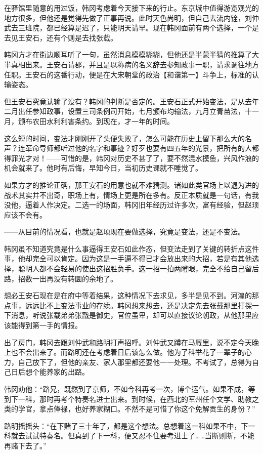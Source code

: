 在驿馆里随意的用过饭，韩冈考虑着今天接下来的行止。东京城中值得游览观光的地方很多，但他还是觉得先做了正事再说。此时天色尚明，但自己去流内铨，刘仲武去三班院，都已经算是迟了，只能明天请早。现在韩冈面前有两个选择，一个是去见王安石，还有个则是去找张载。

韩冈方才在街边顺耳听了一句，虽然消息模模糊糊，但他还是半蒙半猜的推算了大半真相出来。王安石请郡，并且是以称病的名义辞去参知政事一职，请求调往地方任职。王安石的这番行动，便是在大宋朝堂的政治【和谐第一】斗争上，标准的认输姿态。

但王安石究竟认输了没有？韩冈的判断是否定的。王安石正式开始变法，是从去年二月出任参知政事，设置三司条例司开始，七月颁布均输法，九月立青苗法，十一月，颁布农田水利利害条约。到现在，才一年的时间。

这么短的时间，变法才刚刚开了头便失败了，怎么可能在历史上留下那么大的名声？连革命导师都听过他的名字和事迹？好歹也要有四五年的光景，把所有的人都得罪光才对！——可惜的是，韩冈对历史不甚了了，要不然混水摸鱼，兴风作浪的机会就来了。他时有后悔，早知今日，当初历史课就不睡觉了。

如果方才的推论正确，那王安石的用意也就不难猜测。诸如此类官场上以退为进的战术其实并不出奇，职场上有，情场上更是所在多有。反正本质就是一句话，有我没他，逼着人作决定。二选一的场面，韩冈旧年经历过许多次，富有经验，但赵顼应该不会有。

——从目前的情况看，也就是赵顼现在要做选择，究竟是变法，还是不变法。

韩冈虽不知道究竟是什么事逼得王安石如此作态，但变法走到了关键的转折点这件事，他却完全可以肯定。因为这是一手逼不得已才会放出来的大招，若是有其他选择，聪明人都不会轻易的使出这招胜负手。这一招一拍两瞪眼，完全不给自己留后路，招数一出再没有转圜的余地了。

想必王安石现在是在府中等着结果，这种情况下去求见，多半是见不到。河湟的那点事，远远比不上变法事业的存续。韩冈想来想去，还是决定先去张载那里打探一下消息，听说张载弟弟张戬是御史，官位虽卑，却可以直接议论朝政，从他那里应该能得到第一手的情报。

出了房门，韩冈去跟刘仲武和路明打声招呼。刘仲武又蹲在马厩里，说不定今天晚上也不会出来了。而路明还在考虑着日后该怎么做。他为了科举花了一辈子的心力，自己放下了，但他的亲友、家人那里都还要他一一处理。不考试了，总得为自己日后想个能养家的出路。

韩冈劝他：“路兄，既然到了京师，不如今科再考一次，博个运气。如果不成，等到下一科，那时再考个特奏名进士出来。到时候，在西北的军州任个文学、助教之类的学官，拿点俸禄，也好养家糊口。不然不是可惜了你这个免解贡生的身份？”

路明摇摇头：“在下赌了三十年了，都是这个想法。总想着这一科如果不中，下一科就去试试特奏名。但真到了下一科，便又忍不住要考进士了……当断则断，不能再赌下去了。”

